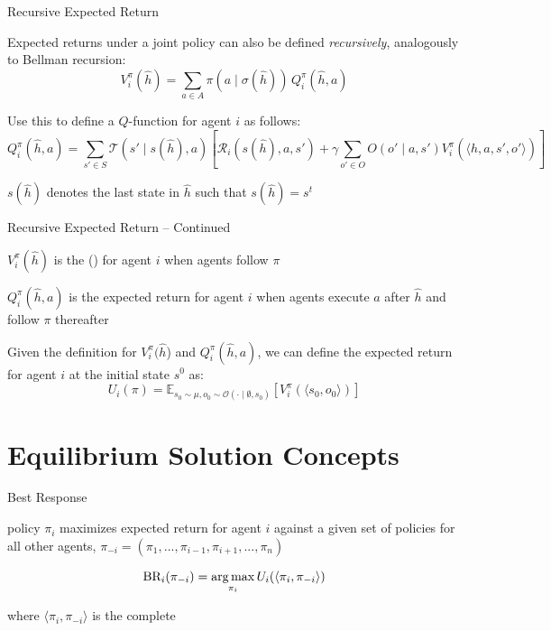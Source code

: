 \begin{frame}{Recursive Expected Return}

    Expected returns under a joint policy can also be defined {\it recursively}, analogously to Bellman recursion:
    \[
        V^{\pi}_i(\hat{h}) = \sum_{a \in A} \pi(a \mid \sigma(\hat{h})) \, Q^{\pi}_i (\hat{h}, a)
    \]

	\vspace{5pt}

    Use this to define a $Q$-function for agent \(i\) as follows:
    \[
        Q^{\pi}_i(\hat{h}, a) = \sum_{s' \in S} \mathcal{T}(s' \mid s(\hat{h}), a) \left[ \mathcal{R}_i(s(\hat{h}), a, s') + \gamma \sum_{o' \in O} O(o' \mid a, s') V^{\pi}_i(\langle \hat{h}, a, s', o'\rangle) \right]
    \]

    \blist
        \item \(s(\hat{h})\) denotes the last state in \(\hat{h}\) such that \(s(\hat{h}) = s^t\)
    \elist
    
\end{frame}

\begin{frame}{Recursive Expected Return -- Continued}

    \blist
    	\itemsep=10pt
        \item \(V^{\pi}_i(\hat{h})\) is the  () for agent \(i\) when agents follow  \(\pi\)
        \item \(Q^{\pi}_i(\hat{h}, a)\) is the expected return for agent \(i\) when agents execute  \(a\) after \(\hat{h}\) and follow \(\pi\) thereafter
        \item Given the definition for \(V^{\pi}_i(\hat{h}\)) and  \(Q^{\pi}_i(\hat{h}, a)\), we can define the expected return for agent \(i\) at the initial state \(s^0\) as:
    \elist
    \vspace{2pt}
    \[
    U_i(\pi) = \mathbb{E}_{s_0 \sim \mu, o_0 \sim \mathcal{O}(\cdot \mid \emptyset,  s_0)} \left[ V^{\pi}_i(\langle s_0, o_0 \rangle) \right]
    \]
    
\end{frame}


\section{Equilibrium Solution Concepts}

\begin{frame}{Best Response}

\begin{bluebox}
	 policy $\pi_i$ maximizes expected return for agent \(i\) against a given set of policies for all other agents, \(\pi_{-i} = (\pi_1, ..., \pi_{i-1}, \pi_{i+1}, ..., \pi_{n})\)
    
    $$\text{BR}_i(\pi_{-i}) = \operatorname*{arg\,max}_{\pi_{i}} U_i(\langle\pi_i, \pi_{-i}\rangle)$$
        
    where $\langle\pi_i, \pi_{-i}\rangle$ is the complete 
\end{bluebox}

\end{frame}

